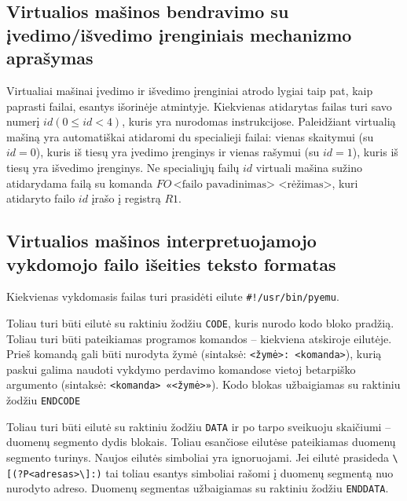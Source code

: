 \subsection{Virtualios mašinos bendravimo su įvedimo/išvedimo įrenginiais
mechanizmo aprašymas}

Virtualiai mašinai įvedimo ir išvedimo įrenginiai atrodo lygiai taip pat,
kaip paprasti failai, esantys išorinėje atmintyje. Kiekvienas atidarytas
failas turi savo numerį $id (0 \leq id < 4)$, kuris yra nurodomas 
instrukcijose. Paleidžiant virtualią mašiną yra automatiškai atidaromi
du specialieji failai: vienas skaitymui (su $id = 0$), kuris iš tiesų yra
įvedimo įrenginys ir vienas rašymui (su $id = 1$), kuris iš tiesų yra 
išvedimo įrenginys. Ne specialiųjų failų $id$ virtuali mašina sužino
atidarydama failą su komanda $FO\,\text{<failo pavadinimas> <rėžimas>}$,
kuri atidaryto failo $id$ įrašo į registrą $R1$.



\subsection{Virtualios mašinos interpretuojamojo vykdomojo failo išeities 
teksto formatas}

Kiekvienas vykdomasis failas turi prasidėti eilute
\verb|#!/usr/bin/pyemu|.

Toliau turi būti eilutė su raktiniu žodžiu \verb|CODE|, kuris nurodo
kodo bloko pradžią. Toliau turi būti pateikiamas programos komandos – 
kiekviena atskiroje eilutėje. Prieš komandą gali būti nurodyta žymė
(sintaksė: \verb|<žymė>: <komanda>|), kurią paskui galima naudoti vykdymo
perdavimo komandose vietoj betarpiško argumento (sintaksė: 
\verb|<komanda> «<žymė>»|). Kodo blokas užbaigiamas su raktiniu žodžiu
\verb|ENDCODE|

Toliau turi būti eilutė su raktiniu žodžiu \verb|DATA| ir po tarpo 
sveikuoju skaičiumi – duomenų segmento dydis blokais.
Toliau esančiose eilutėse pateikiamas duomenų segmento turinys. Naujos
eilutės simboliai yra ignoruojami. Jei eilutė prasideda 
\verb|\[(?P<adresas>\]:)| tai toliau esantys simboliai rašomi į duomenų
segmentą nuo nurodyto adreso. Duomenų segmentas užbaigiamas su 
raktiniu žodžiu \verb|ENDDATA|.

